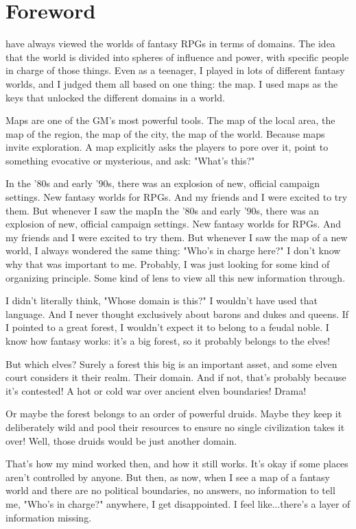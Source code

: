 \documentclass[10pt,a4paper,twoside,bg=print,twocolumn,openany,nodeprecatedcode]{dndbook}
\date{}
\begin{document}
\frontmatter
\tableofcontents
\mainmatter
\chapter{Foreword}
 have always viewed the worlds of fantasy RPGs in terms of domains. The idea that the world is divided into spheres of influence and power, with specific people in charge of those things. Even as a teenager, I played in lots of different fantasy worlds, and I judged them all based on one thing: the map. I used maps as the keys that unlocked the different domains in a world.


Maps are one of the GM's most powerful tools. The map of the local area, the map of the region, the map of the city, the map of the world. Because maps invite exploration. A map explicitly asks the players to pore over it, point to something evocative or mysterious, and ask: "What's this?"

In the '80s and early '90s, there was an explosion of new, official campaign settings. New fantasy worlds for RPGs. And my friends and I were excited to try them. But whenever I saw the mapIn the '80s and early '90s, there was an explosion of new, official campaign settings. New fantasy worlds for RPGs. And my friends and I were excited to try them. But whenever I saw the map of a new world, I always wondered the same thing: "Who's in charge here?" I don't know why that was important to me. Probably, I was just looking for some kind of organizing principle. Some kind of lens to view all this new information through.

I didn't literally think, "Whose domain is this?" I wouldn't have used that language. And I never thought exclusively about barons and dukes and queens. If I pointed to a great forest, I wouldn't expect it to belong to a feudal noble. I know how fantasy works: it's a big forest, so it probably belongs to the elves!

But which elves? Surely a forest this big is an important asset, and some elven court considers it their realm. Their domain. And if not, that's probably because it's contested! A hot or cold war over ancient elven boundaries! Drama!

Or maybe the forest belongs to an order of powerful druids. Maybe they keep it deliberately wild and pool their resources to ensure no single civilization takes it over! Well, those druids would be just another domain.

That's how my mind worked then, and how it still works. It's okay if some places aren't controlled by anyone. But then, as now, when I see a map of a fantasy world and there are no political boundaries, no answers, no information to tell me, "Who's in charge?" anywhere, I get disappointed. I feel like...there's a layer of information missing.
\end{document}
